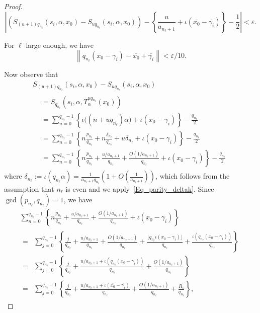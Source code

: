 \documentclass[10pt,a4paper]{amsart}
\numberwithin{equation}{section}
\newcommand{\kj}{n_{\ell}}
\theoremstyle{definition}
\begin{document}
\begin{proof}
\begin{equation}\label{partial_sum_sawtooth}
\left|\left(S_{(u+1)q_{\kj}}(s_i,\alpha,x_0) - S_{uq_{\kj}}(s_i,\alpha,x_0)\right)
- \left \{ \frac{u}{a_{\kj +1}} + \iota(\overline{x_0} - \overline{\gamma_i}) \right \} - \frac{1}{2} \right| < \varepsilon.
\end{equation}

For $\ell$ large enough, we have
\[
\left\| q_{\kj} (x_0-\gamma_i) - \overline{x_0} + \overline{\gamma_i}\right\| < \varepsilon/10.
\]

Now observe that
\begin{multline*}
S_{(u+1)q_{\kj}}(s_i,\alpha,x_0) - S_{uq_{\kj}}(s_i,\alpha,x_0)\\
\begin{aligned}
&= S_{q_{\kj}}\left(s_i, \alpha, T_{\alpha}^{uq_{\kj}}(x_0)\right) \\
&=\sum_{n = 0}^{q_{\kj}-1} \left \{ \iota\big((n + uq_{\kj})\alpha \big) + \iota(x_0-\gamma_i)\right \} - \frac{q_{\kj}}{2}\\
&=
\sum_{n = 0}^{q_{\kj}-1} \left \{ n\frac{p_{\kj}}{q_{\kj}} + n\frac{\delta_{\kj}}{q_{\kj}}+u\delta_{\kj} + \iota(x_0 -\gamma_i) \right\} - \frac{q_{\kj}}{2} \\
&= \sum_{n = 0}^{q_{\kj}-1} \left\{ n\frac{p_{\kj}}{q_{\kj}} +\frac{u/a_{\kj+1}}{q_{\kj}} + \frac{O(1/a_{\kj+1})}{q_{\kj}} + \iota(x_0 - \gamma_i) \right\} - \frac{q_{\kj}}{2}
\end{aligned}
\end{multline*}
where $\delta_{\kj} := \iota(q_{\kj} \alpha) = \frac{1}{a_{\kj+1}q_{\kj}}(1 + O(\frac{1}{a_{\kj+1}}))$, which follows from the assumption that $\kj$ is even and we apply~\eqref{Eq_parity_deltak}. Since $\gcd(p_{\kj},q_{\kj}) =1$, we have
\begin{multline*}
\sum_{n = 0}^{q_{\kj}-1} \left \{ n\frac{p_{\kj}}{q_{\kj}} +\frac{u/a_{\kj+1}}{q_{\kj}} + \frac{O(1/a_{\kj+1})}{q_{\kj}} + \iota(x_0 -\gamma_i) \right\}
\\
\begin{aligned}
=&
\sum_{j = 0}^{q_{\kj}-1} \left \{ \frac{j}{q_{\kj}} +\frac{u/a_{\kj+1}}{q_{\kj}} + \frac{O(1/a_{\kj+1})}{q_{\kj}} + \frac{\lfloor q_{\kj} \iota(x_0 - \gamma_i)\rfloor}{q_{\kj}} + \frac{\iota(q_{\kj} (x_0- \gamma_i))}{q_{\kj}} \right \}\\
=&
\sum_{j = 0}^{q_{\kj}-1} \left\{ \frac{j}{q_{\kj}} +\frac{u/a_{\kj+1} + \iota \left(q_{\kj} (x_0- \gamma_i)\right)}{q_{\kj}} + \frac{O(1/a_{\kj+1})}{q_{\kj}}\right\}
\\
=&
\sum_{j = 0}^{q_{\kj}-1} \left\{ \frac{j}{q_{\kj}} +\frac{u/a_{\kj+1} + \iota \left(\overline{x_0} - \overline{\gamma_i}\right)}{q_{\kj}} + \frac{O(1/a_{\kj+1})}{q_{\kj}} + \frac{R_\varepsilon}{q_{\kj}}\right\},
\end{aligned}
\end{multline*}


\end{proof}
\end{document}
